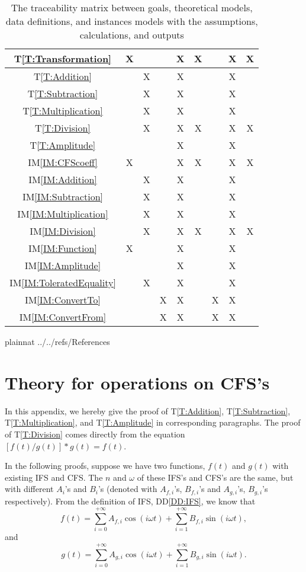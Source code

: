 \documentclass[12pt]{article}
\newcommand{\ddref}[1]{DD\ref{#1}}
\newcommand{\tref}[1]{T\ref{#1}}
\newcommand{\iref}[1]{IM\ref{#1}}
\begin{document}
\begin{table}
\begin{tabular}{|c|c|c|c|c|c|c|c|c|}
		\tref{T:Transformation}
		&X& & &X&X& &X&X\\\hline
		\tref{T:Addition}
		& &X& &X& & &X& \\\hline
		\tref{T:Subtraction}
		& &X& &X& & &X& \\\hline
		\tref{T:Multiplication}
		& &X& &X& & &X& \\\hline
		\tref{T:Division}
		& &X& &X&X& &X&X\\\hline
		\tref{T:Amplitude}
		& & & &X& & &X& \\\hline
		\iref{IM:CFScoeff}
		&X& & &X&X& &X&X\\\hline
		\iref{IM:Addition}
		& &X& &X& & &X& \\\hline
		\iref{IM:Subtraction}
		& &X& &X& & &X& \\\hline
		\iref{IM:Multiplication}
		& &X& &X& & &X& \\\hline
		\iref{IM:Division}
		& &X& &X&X& &X&X\\\hline
		\iref{IM:Function}
		&X& & &X& & &X& \\\hline
		\iref{IM:Amplitude}
		& & & &X& & &X& \\\hline
		\iref{IM:ToleratedEquality}
		& &X& &X& & &X& \\\hline
		\iref{IM:ConvertTo}
		& & &X&X& &X&X& \\\hline
		\iref{IM:ConvertFrom}
		& & &X&X& &X&X& \\\hline		
	\end{tabular}
	\caption{The traceability matrix between goals, theoretical models, data definitions, and instances models with the assumptions, calculations, and outputs}
	\label{Table:Traceability}
\end{table} 
\newpage

 {plainnat}
 {../../refs/References}

\newpage
\appendix

\section{Theory for operations on CFS's}\label{Appendix:Operations}
In this appendix, we hereby give the proof of  \tref{T:Addition}, \tref{T:Subtraction}, \tref{T:Multiplication}, and
\tref{T:Amplitude} in corresponding paragraphs. The proof of \tref{T:Division} comes directly from the equation $[f(t)/g(t)]*g(t)=f(t)$.

In the following proofs, suppose we have two functions, $f(t)$ and $g(t)$ with existing IFS and CFS. The $n$ and $\omega$ of these IFS's and CFS's are the same, but with different $A_i$'s and $B_i$'s (denoted with $A_{f, i}$'s, $B_{f, i}$'s and $A_{g,i}$'s, $B_{g,i}$'s respectively).
From the definition of IFS, \ddref{DD:IFS}, we know that \begin{equation}\label{Eq:fDef}
	f(t)=\sum_{i=0}^{+\infty}A_{f, i}\cos(i\omega t)+\sum_{i=1}^{+\infty}B_{f, i}\sin(i\omega t),
\end{equation} and \begin{equation}\label{Eq:gDef}
	g(t)=\sum_{i=0}^{+\infty}A_{g, i}\cos(i\omega t)+\sum_{i=1}^{+\infty}B_{g, i}\sin(i\omega t).
\end{equation}  
\end{document}
